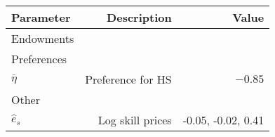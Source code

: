 \begin{tabular}{lrr}
\hline
Parameter & Description  & Value  \\
\hline
Endowments &   &   \\
Preferences &   &   \\
$\bar{\eta}$ & Preference for HS  & $-0.85$  \\
Other &   &   \\
$\hat{e}_{s}$ & Log skill prices  & -0.05, -0.02, 0.41  \\
\hline
\end{tabular}%
